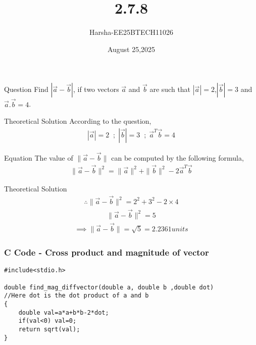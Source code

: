 \documentclass{beamer}
\title %
{2.7.8}
\date{August 25,2025}
\author %
{Harsha-EE25BTECH11026}
\begin{document}
\frame{\titlepage}
\begin{frame}{Question}
Find $|\vec{a}-\vec{b}|$, if two vectors $\vec{a}$ and $\vec{b}$ are such that $|\vec{a}|=2$,$|\vec{b}|=3$ and $\vec{a}.\vec{b}=4$.
\end{frame}



\begin{frame}{Theoretical Solution}
According to the question,\\
\begin{align}
    |\vec{a}|=2 \;\; ; \; |\vec{b}|=3 \;\; ;\; \vec{a}^T\vec{b}=4
\end{align}
\end{frame}

\begin{frame}{Equation}
The  value of $\|\vec{a}-\vec{b}\|$ can be computed by the following formula,
\begin{align}
    \|\vec{a}-\vec{b}\|^2=\|\vec{a}\|^2+\|\vec{b}\|^2-2\vec{a}^T\vec{b}
\end{align}
\end{frame}

\begin{frame}{Theoretical Solution}
\begin{align}
    \therefore \|\vec{a}-\vec{b}\|^2=2^2+3^2-2\times4
\end{align}
\begin{align}
    \|\vec{a}-\vec{b}\|^2=5
\end{align}
\begin{align}
    \implies \|\vec{a}-\vec{b}\|=\sqrt{5}=2.2361 units
\end{align}

\end{frame}



\begin{frame}[fragile]
    \frametitle{C Code - Cross product and magnitude of vector}

    \begin{lstlisting}
#include<stdio.h>

double find_mag_diffvector(double a, double b ,double dot)
//Here dot is the dot product of a and b
{
	double val=a*a+b*b-2*dot;
	if(val<0) val=0;
	return sqrt(val);
}
    \end{lstlisting}
\end{frame}
\end{document}
